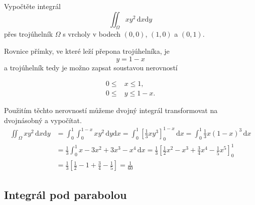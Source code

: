 

Vypočtěte integrál
$$  \iint_\Omega xy^2\,\mathrm dx \mathrm dy
$$
přes trojúhelník $\Omega$ s vrcholy v bodech $(0,0)$, $(1,0)$ a $(0,1)$.

\reseni

Rovnice přímky, ve které leží přepona trojúhelníka, je
$$y=1-x$$ a trojúhelník tedy je možno zapsat soustavou nerovností

$$
\begin{aligned}
  0\leq &x\leq 1,\\
  0\leq &y \leq 1-x.
\end{aligned}
$$

Použitím těchto nerovností můžeme dvojný integrál transformovat na dvojnásobný a vypočítat.
$$
\begin{aligned}
  \iint_\Omega xy^2\,\mathrm dx\mathrm dy
  &=\int_0^1 \int_0^{1-x} xy^2\,\mathrm dy\mathrm dx
  =\int_0^1 \left[\frac 13 xy^3\right]_0^{1-x}\,\mathrm dx
  =\int_0^1 \frac 13x(1-x)^3\,\mathrm dx
  \\&=\frac 13 \int_0^1 x-3x^2+3x^3-x^4\,\mathrm dx
  =\frac 13\left[\frac 12 x^2 - x^3 +\frac 34 x^4-\frac 15 x^5\right]_0^1
  \\&=\frac 13\left[\frac 12 -1 +\frac 34 -\frac 15\right] =\frac 1{60}
\end{aligned}
$$

\konec 


\subsection{Integrál pod parabolou}



